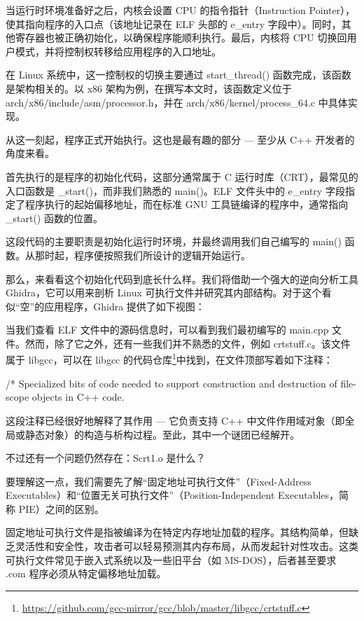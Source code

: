 当运行时环境准备好之后，内核会设置 CPU 的指令指针（Instruction Pointer），使其指向程序的入口点（该地址记录在 ELF 头部的 e\_entry 字段中）。同时，其他寄存器也被正确初始化，以确保程序能顺利执行。最后，内核将 CPU 切换回用户模式，并将控制权转移给应用程序的入口地址。

在 Linux 系统中，这一控制权的切换主要通过 start\_thread() 函数完成，该函数是架构相关的。以 x86 架构为例，在撰写本文时，该函数定义位于 arch/x86/include/asm/processor.h，并在 arch/x86/kernel/process\_64.c 中具体实现。

从这一刻起，程序正式开始执行。这也是最有趣的部分 --- 至少从 C++ 开发者的角度来看。

首先执行的是程序的初始化代码，这部分通常属于 C 运行时库（CRT），最常见的入口函数是 \_start()，而非我们熟悉的 main()。ELF 文件头中的 e\_entry 字段指定了程序执行的起始偏移地址，而在标准 GNU 工具链编译的程序中，通常指向 \_start() 函数的位置。

这段代码的主要职责是初始化运行时环境，并最终调用我们自己编写的 main() 函数。从那时起，程序便按照我们所设计的逻辑开始运行。

那么，来看看这个初始化代码到底长什么样。我们将借助一个强大的逆向分析工具 Ghidra，它可以用来剖析 Linux 可执行文件并研究其内部结构。对于这个看似“空”的应用程序，Ghidra 提供了如下视图：


当我们查看 ELF 文件中的源码信息时，可以看到我们最初编写的 main.cpp 文件。然而，除了它之外，还有一些我们并不熟悉的文件，例如 crtstuff.c。该文件属于 libgcc，可以在 libgcc 的代码仓库\footnote{\url{https://github.com/gcc-mirror/gcc/blob/master/libgcc/crtstuff.c}}中找到，在文件顶部写着如下注释：

\begin{cpp}
/* Specialized bits of code needed to support construction and destruction of file-scope objects in C++ code.
\end{cpp}

这段注释已经很好地解释了其作用 --- 它负责支持 C++ 中文件作用域对象（即全局或静态对象）的构造与析构过程。至此，其中一个谜团已经解开。

不过还有一个问题仍然存在：Scrt1.o 是什么？

要理解这一点，我们需要先了解“固定地址可执行文件”（Fixed-Address Executables）和“位置无关可执行文件”（Position-Independent Executables，简称 PIE）之间的区别。

固定地址可执行文件是指被编译为在特定内存地址加载的程序。其结构简单，但缺乏灵活性和安全性，攻击者可以轻易预测其内存布局，从而发起针对性攻击。这类可执行文件常见于嵌入式系统以及一些旧平台（如 MS-DOS），后者甚至要求 .com 程序必须从特定偏移地址加载。

